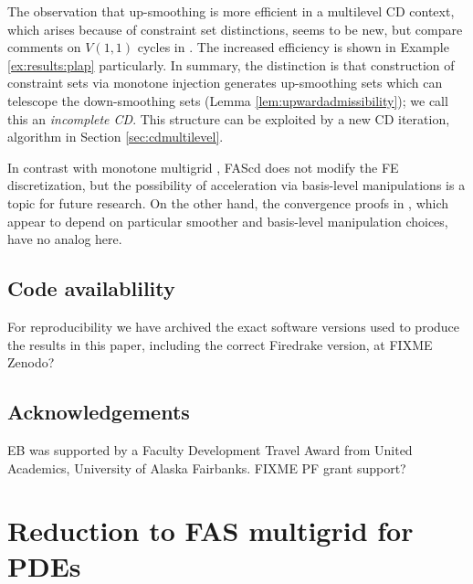 \documentclass[letterpaper,final,12pt,reqno]{amsart}
\theoremstyle{cstyle}
\theoremstyle{cstyle*}
\theoremstyle{dstyle}
\numberwithin{equation}{section}
\numberwithin{figure}{section}
\numberwithin{table}{section}
\numberwithin{theorem}{section}
\begin{document}
The observation that up-smoothing is more efficient in a multilevel CD context, which arises because of constraint set distinctions, seems to be new, but compare comments on $V(1,1)$ cycles in \cite{GraeserKornhuber2009,Tai2003}.  The increased efficiency is shown in Example \ref{ex:results:plap} particularly.  In summary, the distinction is that construction of constraint sets via monotone injection generates up-smoothing sets which can telescope the down-smoothing sets (Lemma \ref{lem:upwardadmissibility}); we call this an \emph{incomplete CD}.  This structure can be exploited by a new CD iteration, algorithm  in Section \ref{sec:cdmultilevel}.

In contrast with monotone multigrid \cite{Kornhuber1994}, FAScd does not modify the FE discretization, but the possibility of acceleration via basis-level manipulations is a topic for future research.  On the other hand,  the convergence proofs in \cite{GraeserKornhuber2009,Kornhuber1994}, which appear to depend on particular smoother and basis-level manipulation choices, have no analog here.



\subsection*{Code availablility} \label{sec:code}  For reproducibility we have archived the exact software versions used to produce the results in this paper, including the correct Firedrake version, at FIXME Zenodo?

\subsection*{Acknowledgements} \label{sec:acknowledgements}  EB was supported by a Faculty Development Travel Award from United Academics, University of Alaska Fairbanks.  FIXME PF grant support?






\appendix
\section{Reduction to FAS multigrid for PDEs} \label{app:reductions}
\end{document}
